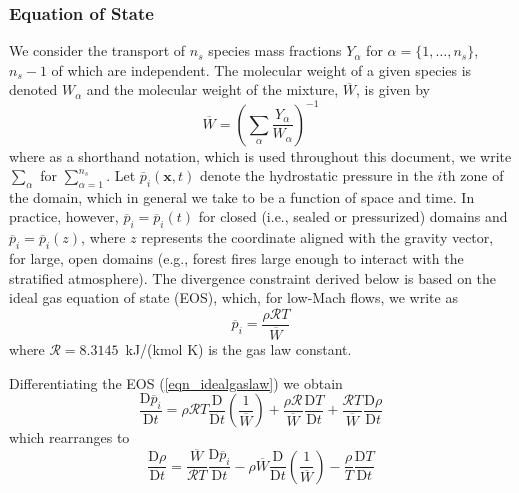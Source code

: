\documentclass[11pt]{book}
\begin{document}
\subsubsection{Equation of State}
\label{EOS}

We consider the transport of $n_s$ species mass fractions $Y_\alpha$ for $\alpha = \{1,\ldots,n_s\}$, $n_s-1$ of which are independent.
The molecular weight of a given species is denoted $W_\alpha$ and the molecular weight of the mixture, $\overline{W}$, is given by
\begin{equation}
\label{eqn_mixmolewt}
\overline{W} = \left( \sum_{\alpha} \frac{Y_\alpha}{W_\alpha} \right)^{-1}
\end{equation}
where as a shorthand notation, which is used throughout this document, we write $\sum_\alpha$ for $\sum_{\alpha = 1}^{n_s}$.
Let $\overline{p}_i(\mathbf{x},t)$ denote the hydrostatic pressure in the $i$th zone of the domain, which in general we take to be a function of space and time.
In practice, however, $\overline{p}_i = \overline{p}_i(t)$ for closed (i.e., sealed or pressurized) domains and $\overline{p}_i = \overline{p}_i(z)$,
where $z$ represents the coordinate aligned with the gravity vector, for large, open domains (e.g., forest fires large enough to interact with the stratified atmosphere).
The divergence constraint derived below is based on the ideal gas equation of state (EOS), which, for low-Mach flows, we write as
\begin{equation}
\label{eqn_idealgaslaw}
\overline{p}_i = \frac{\rho \mathcal{R} T}{\overline{W}}
\end{equation}
where $\mathcal{R} = 8.3145$~kJ/(kmol K) is the gas law constant.

Differentiating the EOS (\ref{eqn_idealgaslaw}) we obtain
\begin{equation}
\label{eqn_DEOS1}
\frac{\mbox{D} \overline{p}_i}{\mbox{D} t} = \rho \mathcal{R} T \frac{\mbox{D}}{\mbox{D} t}\left(\frac{1}{\overline{W}}\right) +
\frac{\rho \mathcal{R}}{\overline{W}} \frac{\mbox{D} T}{\mbox{D} t} + \frac{\mathcal{R}T}{\overline{W}} \frac{\mbox{D} \rho}{\mbox{D} t}
\end{equation}
which rearranges to
\begin{equation}
\label{eqn_DEOS2}
\frac{\mbox{D} \rho}{\mbox{D} t} = \frac{\overline{W}}{\mathcal{R}T} \frac{\mbox{D}\overline{p}_i}{\mbox{D} t} -
\rho \overline{W} \frac{\mbox{D}}{\mbox{D} t}\left(\frac{1}{\overline{W}}\right) - \frac{\rho}{T} \frac{\mbox{D} T}{\mbox{D} t}
\end{equation}
\end{document}
